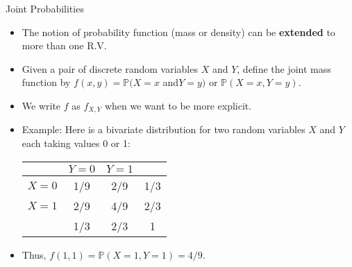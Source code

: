 \documentclass[handout]{beamer}
\begin{document}
\begin{frame}{Joint Probabilities}
\scriptsize{
\begin{itemize}
 \item The notion of probability function (mass or density) can be \textbf{extended} to more than one R.V.  
 \item Given a pair of discrete random variables $X$ and $Y$, define the joint mass function by $f(x,y) = \mathbb{P}(X = x $ and$ Y = y)$ or $\mathbb{P}(X = x, Y = y)$.
 
 \item We write $f$ as $f_{X,Y}$ when we want to be more explicit.
 
 \item Example: Here is a bivariate distribution for two random variables $X$ and $Y$ each taking values 0 or 1:
 \begin{table}
\centering
 \begin{tabular}{c|cc|c}
& $Y=0$ & $Y=1$ & \\ \hline
$X=0$ & 1/9 & 2/9 & 1/3 \\
$X=1$ & 2/9 & 4/9 & 2/3 \\ \hline
& 1/3 & 2/3 & 1 \\
\end{tabular} 
\end{table} 
 
\item Thus, $f(1, 1) = \mathbb{P}(X = 1, Y = 1) = 4/9$. 
 


\end{itemize}

} 
\end{frame}
\end{document}
